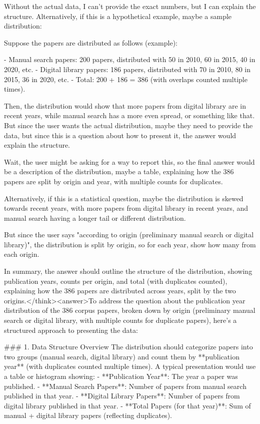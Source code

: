 Without the actual data, I can't provide the exact numbers, but I can explain the structure. Alternatively, if this is a hypothetical example, maybe a sample distribution:

Suppose the papers are distributed as follows (example):

- Manual search papers: 200 papers, distributed with 50 in 2010, 60 in 2015, 40 in 2020, etc.
- Digital library papers: 186 papers, distributed with 70 in 2010, 80 in 2015, 36 in 2020, etc.
- Total: 200 + 186 = 386 (with overlaps counted multiple times).

Then, the distribution would show that more papers from digital library are in recent years, while manual search has a more even spread, or something like that. But since the user wants the actual distribution, maybe they need to provide the data, but since this is a question about how to present it, the answer would explain the structure.

Wait, the user might be asking for a way to report this, so the final answer would be a description of the distribution, maybe a table, explaining how the 386 papers are split by origin and year, with multiple counts for duplicates.

Alternatively, if this is a statistical question, maybe the distribution is skewed towards recent years, with more papers from digital library in recent years, and manual search having a longer tail or different distribution.

But since the user says "according to origin (preliminary manual search or digital library)", the distribution is split by origin, so for each year, show how many from each origin.

In summary, the answer should outline the structure of the distribution, showing publication years, counts per origin, and total (with duplicates counted), explaining how the 386 papers are distributed across years, split by the two origins.</think><answer>To address the question about the publication year distribution of the 386 corpus papers, broken down by origin (preliminary manual search or digital library, with multiple counts for duplicate papers), here’s a structured approach to presenting the data:  


### 1. Data Structure Overview  
The distribution should categorize papers into two groups (manual search, digital library) and count them by **publication year** (with duplicates counted multiple times). A typical presentation would use a table or histogram showing:  
- **Publication Year**: The year a paper was published.  
- **Manual Search Papers**: Number of papers from manual search published in that year.  
- **Digital Library Papers**: Number of papers from digital library published in that year.  
- **Total Papers (for that year)**: Sum of manual + digital library papers (reflecting duplicates).  


